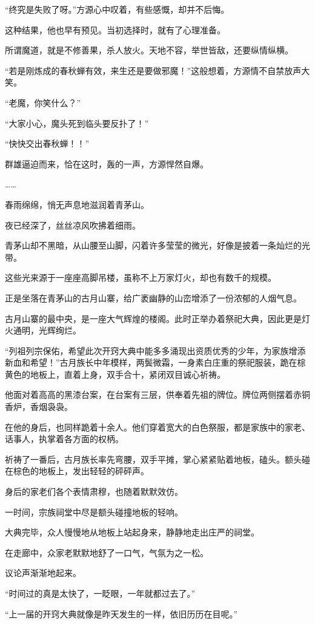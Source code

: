 \begin{this_body}
“终究是失败了呀。”方源心中叹着，有些感慨，却并不后悔。

这种结果，他也早有预见。当初选择时，就有了心理准备。

所谓魔道，就是不修善果，杀人放火。天地不容，举世皆敌，还要纵情纵横。

“若是刚炼成的春秋蝉有效，来生还是要做邪魔！”这般想着，方源情不自禁放声大笑。

“老魔，你笑什么？”

“大家小心，魔头死到临头要反扑了！”

“快快交出春秋蝉！！”

群雄逼迫而来，恰在这时，轰的一声，方源悍然自爆。

……

春雨绵绵，悄无声息地滋润着青茅山。

夜已经深了，丝丝凉风吹拂着细雨。

青茅山却不黑暗，从山腰至山脚，闪着许多莹莹的微光，好像是披着一条灿烂的光带。

这些光来源于一座座高脚吊楼，虽称不上万家灯火，却也有数千的规模。

正是坐落在青茅山的古月山寨，给广袤幽静的山峦增添了一份浓郁的人烟气息。

古月山寨的最中央，是一座大气辉煌的楼阁。此时正举办着祭祀大典，因此更是灯火通明，光辉绚烂。

“列祖列宗保佑，希望此次开窍大典中能多多涌现出资质优秀的少年，为家族增添新血和希望！”古月族长中年模样，两鬓微霜，一身素白庄重的祭祀服装，跪在棕黄色的地板上，直着上身，双手合十，紧闭双目诚心祈祷。

他面对着高高的黑漆台案，在台案有三层，供奉着先祖的牌位。牌位两侧摆着赤铜香炉，香烟袅袅。

在他的身后，也同样跪着十余人。他们穿着宽大的白色祭服，都是家族中的家老、话事人，执掌着各方面的权柄。

祈祷了一番后，古月族长率先弯腰，双手平摊，掌心紧紧贴着地板，磕头。额头碰在棕色的地板上，发出轻轻的砰砰声。

身后的家老们各个表情肃穆，也随着默默效仿。

一时间，宗族祠堂中尽是额头碰撞地板的轻响。

大典完毕，众人慢慢地从地板上站起身来，静静地走出庄严的祠堂。

在走廊中，众家老默默地舒了一口气，气氛为之一松。

议论声渐渐地起来。

“时间过的真是太快了，一眨眼，一年就都过去了。”

“上一届的开窍大典就像是昨天发生的一样，依旧历历在目呢。”


\end{this_body}
